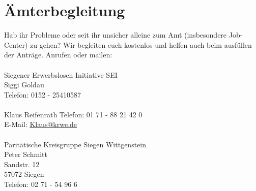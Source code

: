 \section{Ämterbegleitung}
Hab ihr Probleme oder seit ihr unsicher alleine zum Amt (insbesondere Job-Center) zu gehen?  Wir begleiten euch kostenlos und helfen auch beim ausfüllen der Anträge. Anrufen oder mailen:\\
\\
Siegener Erwerbslosen Initiative  SEI \\
Siggi Goldau \\
Telefon: 0152 - 25410587 \\
\\
Klaus Reifenrath 
Telefon: 01 71 - 88 21 42 0\\
E-Mail: \href{mailto:Klaus@krwe.de}{Klaus@krwe.de}\\
\\
Paritätische Kreisgruppe Siegen Wittgenstein\\ 
Peter Schmitt\\
Sandstr. 12\\
57072 Siegen\\
Telefon: 02 71 - 54 96 6